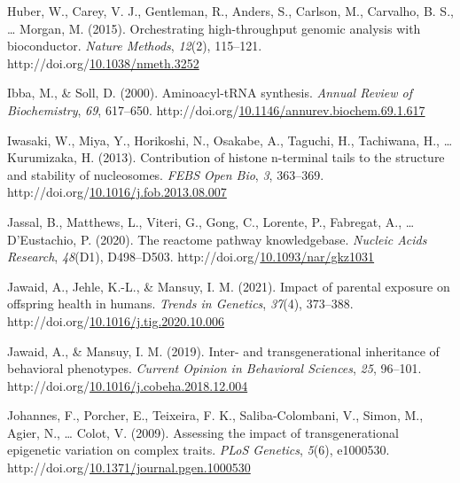 \documentclass[12pt,twoside]{reedthesis}
\newlength{\cslhangindent}
\newenvironment{CSLReferences}[2] %
 {%
  \setlength{\parindent}{0pt}
  \ifodd #1 \everypar{\setlength{\hangindent}{\cslhangindent}}\ignorespaces\fi
  \ifnum #2 > 0
  \setlength{\parskip}{#2\baselineskip}
  \fi
 }%
 {}
\begin{document}
\begin{CSLReferences}{1}{0}
\leavevmode{}%
Huber, W., Carey, V. J., Gentleman, R., Anders, S., Carlson, M., Carvalho, B. S., \ldots{} Morgan, M. (2015). Orchestrating high-throughput genomic analysis with bioconductor. \emph{Nature Methods}, \emph{12}(2), 115--121. http://doi.org/\href{https://doi.org/10.1038/nmeth.3252}{10.1038/nmeth.3252}

\leavevmode{}%
Ibba, M., \& Soll, D. (2000). Aminoacyl-tRNA synthesis. \emph{Annual Review of Biochemistry}, \emph{69}, 617--650. http://doi.org/\href{https://doi.org/10.1146/annurev.biochem.69.1.617}{10.1146/annurev.biochem.69.1.617}

\leavevmode{}%
Iwasaki, W., Miya, Y., Horikoshi, N., Osakabe, A., Taguchi, H., Tachiwana, H., \ldots{} Kurumizaka, H. (2013). Contribution of histone n-terminal tails to the structure and stability of nucleosomes. \emph{FEBS Open Bio}, \emph{3}, 363--369. http://doi.org/\href{https://doi.org/10.1016/j.fob.2013.08.007}{10.1016/j.fob.2013.08.007}

\leavevmode{}%
Jassal, B., Matthews, L., Viteri, G., Gong, C., Lorente, P., Fabregat, A., \ldots{} D'Eustachio, P. (2020). The reactome pathway knowledgebase. \emph{Nucleic Acids Research}, \emph{48}(D1), D498--D503. http://doi.org/\href{https://doi.org/10.1093/nar/gkz1031}{10.1093/nar/gkz1031}

\leavevmode{}%
Jawaid, A., Jehle, K.-L., \& Mansuy, I. M. (2021). Impact of parental exposure on offspring health in humans. \emph{Trends in Genetics}, \emph{37}(4), 373--388. http://doi.org/\href{https://doi.org/10.1016/j.tig.2020.10.006}{10.1016/j.tig.2020.10.006}

\leavevmode{}%
Jawaid, A., \& Mansuy, I. M. (2019). Inter- and transgenerational inheritance of behavioral phenotypes. \emph{Current Opinion in Behavioral Sciences}, \emph{25}, 96--101. http://doi.org/\href{https://doi.org/10.1016/j.cobeha.2018.12.004}{10.1016/j.cobeha.2018.12.004}

\leavevmode{}%
Johannes, F., Porcher, E., Teixeira, F. K., Saliba-Colombani, V., Simon, M., Agier, N., \ldots{} Colot, V. (2009). Assessing the impact of transgenerational epigenetic variation on complex traits. \emph{PLoS Genetics}, \emph{5}(6), e1000530. http://doi.org/\href{https://doi.org/10.1371/journal.pgen.1000530}{10.1371/journal.pgen.1000530}


\end{CSLReferences}
\end{document}
